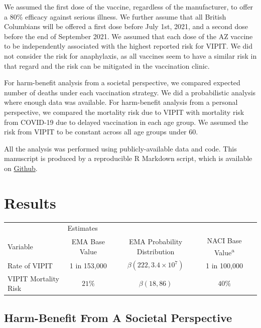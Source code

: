 \documentclass[]{interact}
\theoremstyle{plain}%
\theoremstyle{definition}
\theoremstyle{remark}
\begin{document}
We assumed the first dose of the vaccine, regardless of the
manufacturer, to offer a 80\% efficacy against serious illness. We
further assume that all British Columbians will be offered a first dose
before July 1st, 2021, and a second dose before the end of September
2021. We assumed that each dose of the AZ vaccine to be independently
associated with the highest reported risk for VIPIT. We did not consider
the risk for anaphylaxis, as all vaccines seem to have a similar risk in
that regard and the risk can be mitigated in the vaccination clinic.

For harm-benefit analysis from a societal perspective, we compared
expected number of deaths under each vaccination strategy. We did a
probabilistic analysis where enough data was available. For harm-benefit
analysis from a personal perspective, we compared the mortality risk due
to VIPIT with mortality risk from COVID-19 due to delayed vaccination in
each age group. We assumed the risk from VIPIT to be constant across all
age groups under 60.

All the analysis was performed using publicly-available data and code.
This manuscript is produced by a reproducible R Markdown script, which
is available on
\href{https://github.com/aminadibi/astrazenecaVIPIT}{Github}.

\hypertarget{results}{%
\section{Results}\label{results}}

\begin{table}
{\begin{tabular}{lcccc} \toprule
 & \multicolumn{2}{l}{Estimates} \\ \cmidrule{2-4}
 Variable & EMA Base Value & EMA Probability Distribution & NACI Base Value\textsuperscript{a}  \\ \midrule
 Rate of VIPIT & 1 in 153,000 & $\beta(222, 3.4\times 10^7)$ & 1 in 100,000 \\
 VIPIT Mortality Risk & $21\%$ &  $\beta(18, 86)$ & $40\%$ \\ \bottomrule
\end{tabular}}
\label{sample-table}
\end{table}

\hypertarget{harm-benefit-from-a-societal-perspective}{%
\subsection{Harm-Benefit From A Societal
Perspective}\label{harm-benefit-from-a-societal-perspective}}
\end{document}
